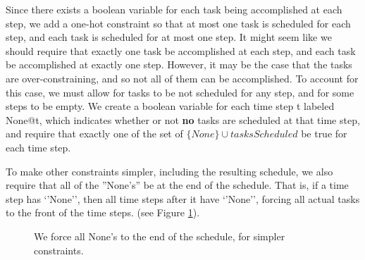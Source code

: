 \documentclass[11pt]{article}
\begin{document}
Since there exists a boolean variable for
each task being accomplished at each step,
we add a one-hot constraint
so that at most one task is scheduled for each step,
and each task is scheduled for at most one step.
It might seem like we should require that
exactly one task be accomplished at each step,
and each task be accomplished at exactly one step.
However, it may be the case that
the tasks are over-constraining,
and so not all of them can be accomplished.
To account for this case,
we must allow for tasks to be not scheduled for any step,
and for some steps to be empty.
We create a boolean variable for each time step t labeled None@t,
which indicates whether or not \textbf{no} tasks are scheduled at that time step,
and require that exactly one of the set of $\{None\} \cup tasksScheduled$
be true for each time step.

To make other constraints simpler,
including the resulting schedule,
we also require that all of the ''None's''
be at the end of the schedule.
That is, if a time step has ‘’None’’,
then all time steps after it have ‘’None’’,
forcing all actual tasks to the front of the time steps.
(see Figure \ref{fig:none-constraints}).
\begin{figure}
  \caption{We force all None's to the end of the schedule, for simpler constraints.}
  \label{fig:none-constraints}
\end{figure}
\end{document}
